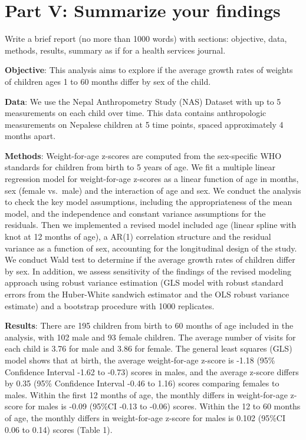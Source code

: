 \documentclass[
]{article}
\begin{document}
\hypertarget{part-v-summarize-your-findings}{%
\section{Part V: Summarize your
findings}\label{part-v-summarize-your-findings}}

Write a brief report (no more than 1000 words) with sections: objective,
data, methods, results, summary as if for a health services journal.

\textbf{Objective}: This analysis aims to explore if the average growth
rates of weights of children ages 1 to 60 months differ by sex of the
child.

\textbf{Data}: We use the Nepal Anthropometry Study (NAS) Dataset with
up to 5 measurements on each child over time. This data contains
anthropologic measurements on Nepalese children at 5 time points, spaced
approximately 4 months apart.

\textbf{Methods}: Weight-for-age z-scores are computed from the
sex-specific WHO standards for children from birth to 5 years of age. We
fit a multiple linear regression model for weight-for-age z-scores as a
linear function of age in months, sex (female vs.~male) and the
interaction of age and sex. We conduct the analysis to check the key
model assumptions, including the appropriateness of the mean model, and
the independence and constant variance assumptions for the residuals.
Then we implemented a revised model included age (linear spline with
knot at 12 months of age), a AR(1) correlation structure and the
residual variance as a function of sex, accounting for the longitudinal
design of the study. We conduct Wald test to determine if the average
growth rates of children differ by sex. In addition, we assess
sensitivity of the findings of the revised modeling approach using
robust variance estimation (GLS model with robust standard errors from
the Huber-White sandwich estimator and the OLS robust variance estimate)
and a bootstrap procedure with 1000 replicates.

\textbf{Results}: There are 195 children from birth to 60 months of age
included in the analysis, with 102 male and 93 female children. The
average number of visits for each child is 3.76 for male and 3.86 for
female. The general least squares (GLS) model shows that at birth, the
average weight-for-age z-score is -1.18 (95\% Confidence Interval -1.62
to -0.73) scores in males, and the average z-score differs by 0.35 (95\%
Confidence Interval -0.46 to 1.16) scores comparing females to males.
Within the first 12 months of age, the monthly differs in weight-for-age
z-score for males is -0.09 (95\%CI -0.13 to -0.06) scores. Within the 12
to 60 months of age, the monthly differs in weight-for-age z-score for
males is 0.102 (95\%CI 0.06 to 0.14) scores (Table 1).
\end{document}
